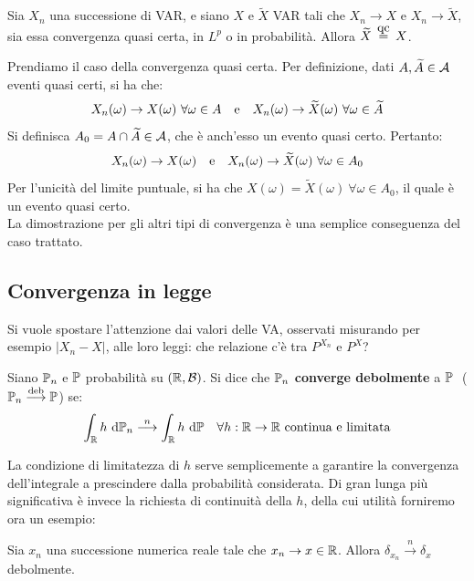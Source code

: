 
\begin{teo}
	Sia $X_n$ una successione di VAR, e siano $X$ e $\widetilde{X}$ VAR tali che $X_n\to X$ e $ X_n \to \widetilde{X}$, sia essa convergenza quasi certa, in $L^p$ o in probabilità. Allora $\widetilde X \aceq X$.
\end{teo}
\begin{dimo}
	Prendiamo il caso della convergenza quasi certa.
	Per definizione, dati $A, \widetilde A \in \mathcal A$ eventi quasi certi, si ha che:
	$$X_n(\omega) \to X(\omega) \ \forall \omega \in A \quad \text e \quad
	X_n(\omega) \to \widetilde X (\omega) \ \forall \omega \in \widetilde A$$
	Si definisca $A_0 = A \cap \widetilde A \in \mathcal A$, che è anch'esso un evento quasi certo.
	Pertanto:
	$$X_n(\omega) \to X(\omega) \quad \text e \quad X_n(\omega) \to \widetilde X(\omega) \ \forall \omega \in A_0$$
	Per l'unicità del limite puntuale, si ha che $X(\omega) = \widetilde X(\omega) \ \forall \omega \in A_0$, il quale è un evento quasi certo. \\
	La dimostrazione per gli altri tipi di convergenza è una semplice conseguenza del caso trattato.
\end{dimo}


\subsection{Convergenza in legge}
Si vuole spostare l'attenzione dai valori delle VA, osservati misurando per esempio $|X_n - X|$, alle loro leggi: che relazione c'è tra $P^{X_n}$ e $P^X$?

\begin{defn}
  Siano $\mathbb P_n$ e $\mathbb P$ probabilità su $(\mathbb R, \mathcal B)$. Si dice che \textbf{$\mathbb P_n$ converge debolmente} a $\mathbb P \ $ ($\mathbb P_n \stackrel{\text{deb}}{\longrightarrow} \mathbb P$) se:
  $$\int_\mathbb R h \ \mathrm d \mathbb P_n \stackrel{n}{\longrightarrow} \int_\mathbb R h \ \mathrm d \mathbb P \quad \forall h: \mathbb R\to \mathbb R \text{ continua e limitata}$$
\end{defn}

La condizione di limitatezza di $h$ serve semplicemente a garantire la convergenza dell'integrale a prescindere dalla probabilità considerata.
Di gran lunga più significativa è invece la richiesta di continuità della $h$, della cui utilità forniremo ora un esempio:

\smallskip
\begin{prop}
  Sia $x_n$ una successione numerica reale tale che $x_n\to x \in \mathbb R$.
  Allora $\delta_{x_n} \stackrel{n}{\longrightarrow} \delta_x$ debolmente.
\end{prop}

